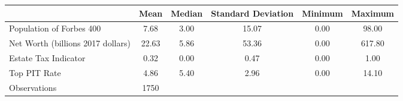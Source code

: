 {
\def\sym#1{\ifmmode^{#1}\else\(^{#1}\)\fi}
\begin{tabular}{l*{1}{ccccc}}
\hline\hline
                    &      Mean&              Median&Standard Deviation&             Minimum&   Maximum\\
\hline
Population of Forbes 400&      7.68&                3.00&     15.07&                0.00&     98.00\\
Net Worth (billions 2017 dollars)&     22.63&                5.86&     53.36&                0.00&    617.80\\
Estate Tax Indicator&      0.32&                0.00&      0.47&                0.00&      1.00\\
Top PIT Rate        &      4.86&                5.40&      2.96&                0.00&     14.10\\
\hline
Observations        &      1750&                    &          &                    &          \\
\hline\hline
\end{tabular}
}

